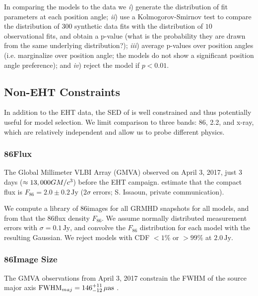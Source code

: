 In comparing the models to the data we
\emph{i}) generate the distribution of fit parameters at each position angle;
\emph{ii}) use a Kolmogorov-Smirnov test to compare the distribution of $300$ synthetic data fits with the distribution of $10$ observational fits, and obtain a p-value (what is the probability they are drawn from the same underlying distribution?);
\emph{iii}) average p-values over position angles (i.e. marginalize over position angle; the models do not show a significant position angle preference); and
\emph{iv}) reject the model if $p < 0.01$.

\subsection{Non-EHT Constraints}

In addition to the EHT data, the SED of \sgra is well constrained  and thus potentially useful for model selection.
We limit comparison to three bands: 86\GHz, 2.2\um, and x-ray, which are relatively independent and allow us to probe different physics.

\subsubsection{86\GHz Flux}

The Global Millimeter VLBI Array (GMVA) observed \sgra on April 3, 2017, just 3 days ($\approx 13,000 GM/c^3$) before the EHT campaign.
\citet{2019ApJ...871...30I} estimate that the compact flux is $F_{86} = 2.0 \pm 0.2\,\mathrm{Jy}$ ($2\sigma$ errors; S. Issaoun, private communication).

We compute a library of 86\GHz images for all GRMHD snapshots for all models, and from that the 86\GHz flux density $F_{86}$.  We assume normally distributed measurement errors with $\sigma = 0.1\,\mathrm{Jy}$, and convolve the $F_{86}$ distribution for each model with the resulting Gaussian.  We reject models with CDF $< 1\%$ or $> 99\%$ at $2.0\,\mathrm{Jy}$.

\subsubsection{86\GHz Image Size}

The GMVA observations from April 3, 2017 constrain the FWHM of the source major axis ${\rm FWHM}_{maj} = 146^{+11}_{-12}\,\mathrm{\mu as}$ \citep[95\% confidence][]{2021ApJ...915...99I}.

